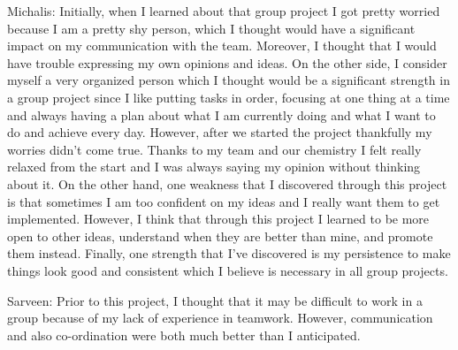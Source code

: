 \documentclass[a4paper]{article}
\begin{document}
Michalis: Initially, when I learned about that group project I got pretty worried because I am a pretty shy person, which 
I thought would have a significant impact on my communication with the team. Moreover, I thought that I would have trouble 
expressing my own opinions and ideas. On the other side, I consider myself a very organized person which I thought would 
be a significant strength in a group project since I like putting tasks in order, focusing at one thing at a time and always 
having a plan about what I am currently doing and what I want to do and achieve every day. However, after we started the 
project thankfully my worries didn't come true. Thanks to my team and our chemistry I felt really relaxed
from the start and I was always saying my opinion without thinking about it. On the other hand, one weakness
that I discovered through this project is that sometimes I am too confident on my ideas and I really want them to get implemented. 
However, I think that through this project  I learned to be more open to other ideas, understand when they are better than mine, 
and promote them instead. Finally, one strength that I've discovered is my persistence to make things look good and consistent which 
I believe is necessary in all group projects.

Sarveen: Prior to this project, I thought that it may be difficult to work in a group because of my lack of experience in teamwork. 
However, communication and also co-ordination were both much better than I anticipated. 
\end{document}
